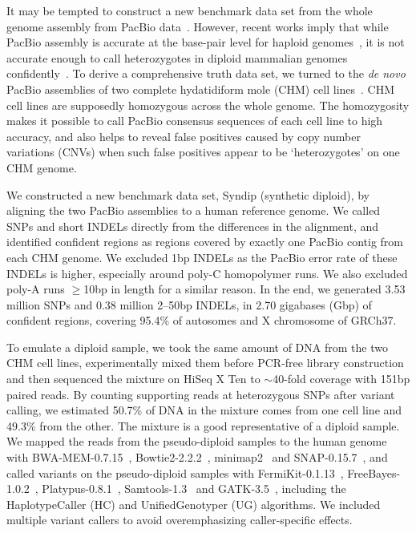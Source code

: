 \documentclass{bioinfo}
\begin{document}
It may be tempted to construct a new benchmark data set from the whole genome
assembly from PacBio data~\citep{Chin:2016aa}. However, recent works imply that while PacBio
assembly is accurate at the base-pair level for haploid
genomes~\citep{Chin:2013qr}, it is not accurate enough to call heterozygotes in
diploid mammalian genomes confidently~\citep{Gordon:2016kq,Seo:2016aa}.  To derive a
comprehensive truth data set, we turned to the \emph{de novo} PacBio
assemblies of two complete hydatidiform mole (CHM) cell
lines~\citep{Schneider072116}. CHM cell lines are supposedly homozygous across
the whole genome. The homozygosity makes it possible to call PacBio consensus
sequences of each cell line to high accuracy, and also helps to reveal false
positives caused by copy number variations (CNVs) when such false positives
appear to be `heterozygotes' on one CHM genome.

We constructed a new benchmark data set, Syndip (synthetic diploid), by aligning the
two PacBio assemblies to a human reference genome. We called SNPs and short
INDELs directly from the differences in the alignment, and identified confident
regions as regions covered by exactly one PacBio contig from each CHM genome.
We excluded 1bp INDELs as the PacBio error rate of these INDELs is higher,
especially around poly-C homopolymer runs. We also excluded poly-A runs
$\ge$10bp in length for a similar reason. In the end, we generated 3.53 million
SNPs and 0.38 million 2--50bp INDELs, in 2.70 gigabases (Gbp) of confident
regions, covering 95.4\% of autosomes and X chromosome of GRCh37.

To emulate a diploid sample, we took the same amount of DNA from the two CHM
cell lines, experimentally mixed them before PCR-free library construction and then
sequenced the mixture on HiSeq X Ten to $\sim$40-fold coverage with 151bp paired reads. By counting supporting
reads at heterozygous SNPs after variant calling, we estimated 50.7\% of DNA in
the mixture comes from one cell line and 49.3\% from the other. The mixture is
a good representative of a diploid sample. We mapped the reads from the
pseudo-diploid samples to the human genome with BWA-MEM-0.7.15~\citep{Li:2013aa},
Bowtie2-2.2.2~\citep{Langmead:2012fk}, minimap2~\citep{Li:2017kk} and SNAP-0.15.7~\citep{Bolosky:2014aa}, and called variants on the pseudo-diploid
samples with FermiKit-0.1.13~\citep{Li:2015eu},
FreeBayes-1.0.2~\citep{Garrison:2012aa}, Platypus-0.8.1~\citep{Rimmer:2014ab},
Samtools-1.3~\citep{Li:2011ab} and GATK-3.5~\citep{Depristo:2011vn}, including
the HaplotypeCaller (HC) and UnifiedGenotyper (UG) algorithms. We included
multiple variant callers to avoid overemphasizing caller-specific
effects.
\end{document}
